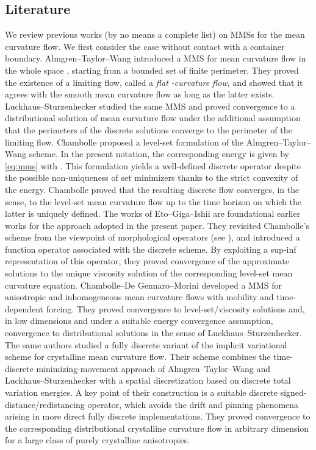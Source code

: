 \documentclass[11pt]{article}
\makeatletter
\numberwithin{equation}{section}
\newcounter{mathrecordid}
\newcommand{\mathboxbegin}[1]{%
  \stepcounter{mathrecordid}%
  \immediate\write\mathrecords{\themathrecordid,#1}%
  \special{pdf:bann << /Type /Annot /Subtype /Link /Border [0 0 0]
    /MathBoxID \themathrecordid /F 2
    /A << /S /URI /URI (urn:mathbox:\themathrecordid) >> >>}}
\newcommand{\mathboxinlineplain}[1]{$#1$}
\newcommand{\mathboxinline}[1]{%
  $\mathboxbegin{inline}#1\special{pdf:eann}$}
\newcommand{\recordmath}{%
  \ifmeasuring@\expandafter\mathboxinlineplain
  \else\expandafter\mathboxinline\fi}
\makeatother
\begin{document}
\subsection{Literature}

We review previous works (by no means a complete list) on MMSs for the mean curvature flow. 
We first consider the case without contact with a container boundary.
Almgren--Taylor--Wang \cite{Almgren93} introduced a MMS for mean curvature flow in the whole space \recordmath{\mathbb{R}^d}, starting from a bounded set \recordmath{E_0} of finite perimeter.  They proved the existence of a limiting flow, called a \textit{flat \recordmath{\Phi}-curvature flow}, and showed that it agrees with the smooth mean curvature flow as long as the latter exists.
Luckhaus--Sturzenhecker \cite{LS95} studied the same MMS and proved convergence to a distributional solution of mean curvature flow under the additional assumption that the perimeters of the discrete solutions converge to the perimeter of the limiting flow.
Chambolle \cite{Chambolle04} proposed a level-set formulation of the Almgren--Taylor--Wang scheme.  In the present notation, the corresponding energy is given by \eqref{eq:mms} with \recordmath{\beta\equiv 0}.  This formulation yields a well-defined discrete operator despite the possible non-uniqueness of set minimizers thanks to the strict convexity of the energy.
Chambolle proved that the resulting discrete flow converges, in the \recordmath{L^1} sense, to the level-set mean curvature flow up to the time horizon on which the latter is uniquely defined.
The works of Eto--Giga--Ishii \cite{EGI12-1,EGI12-2} are foundational earlier works for the approach adopted in the present paper.  They revisited Chambolle's scheme from the viewpoint of morphological operators (see \cite{C03}), and introduced a function operator associated with the discrete scheme.  By exploiting a sup-inf representation of this operator, they proved convergence of the approximate solutions to the unique viscosity solution of the corresponding level-set mean curvature equation.
Chambolle--De Gennaro--Morini \cite{CDM24} developed a MMS for anisotropic and inhomogeneous mean curvature flows with mobility and time-dependent forcing.  They proved convergence to level-set/viscosity solutions and, in low dimensions and under a suitable energy convergence assumption, convergence to distributional solutions in the sense of Luckhaus--Sturzenhecker.
The same authors \cite{CDGM26} studied a fully discrete variant of the implicit variational scheme for crystalline mean curvature flow.  Their scheme combines the time-discrete minimizing-movement approach of Almgren--Taylor--Wang and Luckhaus--Sturzenhecker with a spatial discretization based on discrete total variation energies.  A key point of their construction is a suitable discrete signed-distance/redistancing operator, which avoids the drift and pinning phenomena arising in more direct fully discrete implementations.  They proved convergence to the corresponding distributional crystalline curvature flow in arbitrary dimension for a large class of purely crystalline anisotropies.
\end{document}
